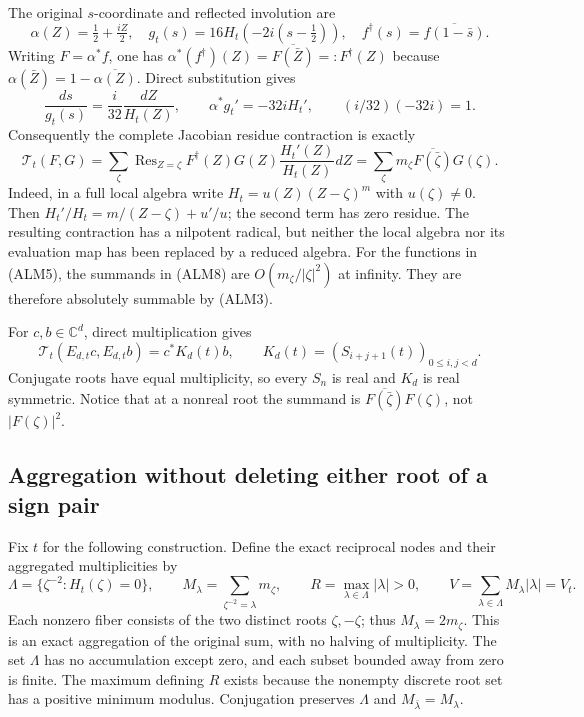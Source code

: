 The original $s$-coordinate and reflected involution are
\begin{equation}\tag{ALM6}
 \alpha(Z)=\tfrac12+\tfrac{iZ}{2},\quad
 g_t(s)=16H_t(-2i(s-\tfrac12)),\quad
 f^\dagger(s)=\overline{f(1-\bar s)}.
\end{equation}
Writing $F=\alpha^*f$, one has
$\alpha^*(f^\dagger)(Z)=\overline{F(\bar Z)}=:F^\dagger(Z)$ because
$\alpha(\bar Z)=1-\overline{\alpha(Z)}$. Direct substitution gives
\begin{equation}\tag{ALM7}
 \frac{ds}{g_t(s)}=\frac{i}{32}\frac{dZ}{H_t(Z)},\qquad
 \alpha^*g_t'=-32iH_t',\qquad
 (i/32)(-32i)=1.
\end{equation}
Consequently the complete Jacobian residue contraction is exactly
\begin{equation}\tag{ALM8}
 \mathcal T_t(F,G)=\sum_\zeta
  \operatorname{Res}_{Z=\zeta}
  F^\dagger(Z)G(Z)\frac{H_t'(Z)}{H_t(Z)}dZ
 =\sum_\zeta m_\zeta\overline{F(\bar\zeta)}G(\zeta).
\end{equation}
Indeed, in a full local algebra write $H_t=u(Z)(Z-\zeta)^m$ with
$u(\zeta)\ne0$. Then $H_t'/H_t=m/(Z-\zeta)+u'/u$; the second term
has zero residue. The resulting contraction has a nilpotent radical,
but neither the local algebra nor its evaluation map has been
replaced by a reduced algebra. For the functions in (ALM5), the
summands in (ALM8) are $O(m_\zeta/|\zeta|^2)$ at infinity. They are
therefore absolutely summable by (ALM3).

For $c,b\in\mathbb C^d$, direct multiplication gives
\begin{equation}\tag{ALM9}
 \mathcal T_t(E_{d,t}c,E_{d,t}b)=c^*K_d(t)b,\qquad
 K_d(t)=(S_{i+j+1}(t))_{0\le i,j<d}.
\end{equation}
Conjugate roots have equal multiplicity, so every $S_n$ is real and
$K_d$ is real symmetric. Notice that at a nonreal root the summand is
$\overline{F(\bar\zeta)}F(\zeta)$, not $|F(\zeta)|^2$.

\subsection{Aggregation without deleting either root of a sign pair}

Fix $t$ for the following construction. Define the exact reciprocal
nodes and their aggregated multiplicities by
\begin{equation}\tag{ALM10}
 \Lambda=\{\zeta^{-2}:H_t(\zeta)=0\},\qquad
 M_\lambda=\sum_{\zeta^{-2}=\lambda}m_\zeta,\qquad
 R=\max_{\lambda\in\Lambda}|\lambda|>0,\qquad
 V=\sum_{\lambda\in\Lambda}M_\lambda|\lambda|=V_t.
\end{equation}
Each nonzero fiber consists of the two distinct roots $\zeta,-\zeta$;
thus $M_\lambda=2m_\zeta$. This is an exact aggregation of the original
sum, with no halving of multiplicity. The set $\Lambda$ has no
accumulation except zero, and each subset bounded away from zero is
finite. The maximum defining $R$ exists because the nonempty discrete
root set has a positive minimum modulus. Conjugation preserves
$\Lambda$ and $M_{\bar\lambda}=M_\lambda$.

